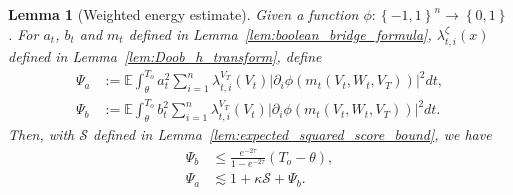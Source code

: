 \documentclass[10pt,a4paper]{amsart}
\newtheorem{lemma}{Lemma}
\newcommand{\Exs}{\ensuremath{{\mathbb{E}}}}
\newcommand{\To}{{T_o}}
\newcommand{\abss}[1]{\left| #1 \right |}
\newcommand{\braces}[1]{\left\{ #1 \right \}}
\newcommand{\btau}{\kappa}
\newcommand{\cS}{\mathcal{S}}
\newcommand{\defn}{:=}
\newcommand{\parenth}[1]{\left( #1 \right)}
\newcommand{\uV}{V}
\newcommand{\uW}{W}
\begin{document}
\begin{lemma}[Weighted energy estimate]
  \label{lem:weighted_energy_estimate}
  Given a function $\phi:\braces{-1,1}^n \to \braces{0, 1}$. For $a_{t}$, $b_{t}$ and $m_{t}$ defined in Lemma~\ref{lem:boolean_bridge_formula}, $\lambda_{t, i}^{\zeta}(x)$ defined in Lemma~\ref{lem:Doob_h_transform}, define
  \begin{align*}
    \Psi_a &\defn \Exs \int_\theta^{\To} a_{t}^2 \sum_{i=1}^n \lambda_{t, i}^{\uV_T}(\uV_t) \abss{\partial_i \phi(m_{t}(\uV_t, \uW_t, \uV_T))}^2 dt, \\
    \Psi_b &\defn \Exs \int_\theta^{\To} b_{t}^2 \sum_{i=1}^n \lambda_{t, i}^{\uV_T}(\uV_t) \abss{\partial_i \phi(m_{t}(\uV_t, \uW_t, \uV_T))}^2 dt.
  \end{align*}
  Then, with $\cS$ defined in Lemma~\ref{lem:expected_squared_score_bound}, we have
  \begin{align*}
    \Psi_b &\leq \frac{e^{-2\tau}}{1-e^{-2\tau}} \parenth{\To - \theta}, \\
    \Psi_a &\lesssim 1 + \btau \cS + \Psi_b.
  \end{align*}
\end{lemma}
\end{document}
